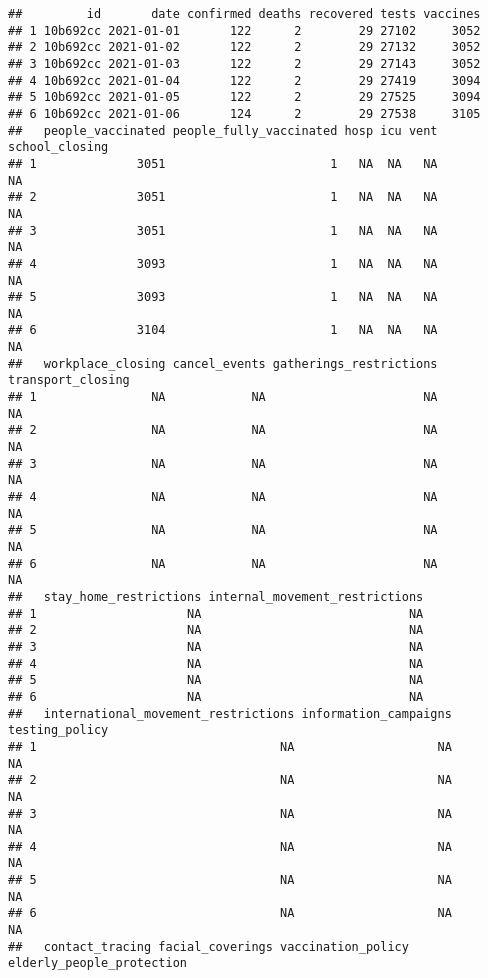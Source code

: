 \documentclass[
]{book}
\begin{document}
\begin{verbatim}
##         id       date confirmed deaths recovered tests vaccines
## 1 10b692cc 2021-01-01       122      2        29 27102     3052
## 2 10b692cc 2021-01-02       122      2        29 27132     3052
## 3 10b692cc 2021-01-03       122      2        29 27143     3052
## 4 10b692cc 2021-01-04       122      2        29 27419     3094
## 5 10b692cc 2021-01-05       122      2        29 27525     3094
## 6 10b692cc 2021-01-06       124      2        29 27538     3105
##   people_vaccinated people_fully_vaccinated hosp icu vent school_closing
## 1              3051                       1   NA  NA   NA             NA
## 2              3051                       1   NA  NA   NA             NA
## 3              3051                       1   NA  NA   NA             NA
## 4              3093                       1   NA  NA   NA             NA
## 5              3093                       1   NA  NA   NA             NA
## 6              3104                       1   NA  NA   NA             NA
##   workplace_closing cancel_events gatherings_restrictions transport_closing
## 1                NA            NA                      NA                NA
## 2                NA            NA                      NA                NA
## 3                NA            NA                      NA                NA
## 4                NA            NA                      NA                NA
## 5                NA            NA                      NA                NA
## 6                NA            NA                      NA                NA
##   stay_home_restrictions internal_movement_restrictions
## 1                     NA                             NA
## 2                     NA                             NA
## 3                     NA                             NA
## 4                     NA                             NA
## 5                     NA                             NA
## 6                     NA                             NA
##   international_movement_restrictions information_campaigns testing_policy
## 1                                  NA                    NA             NA
## 2                                  NA                    NA             NA
## 3                                  NA                    NA             NA
## 4                                  NA                    NA             NA
## 5                                  NA                    NA             NA
## 6                                  NA                    NA             NA
##   contact_tracing facial_coverings vaccination_policy elderly_people_protection

\end{verbatim}
\end{document}
